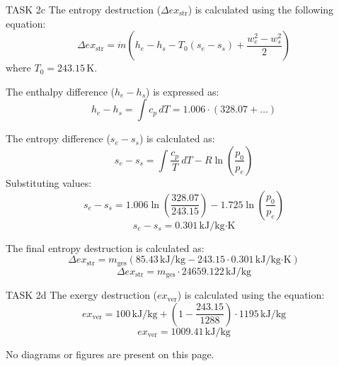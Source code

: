 TASK 2c  
The entropy destruction (\( \Delta ex_{\text{str}} \)) is calculated using the following equation:  
\[
\Delta ex_{\text{str}} = \dot{m}(h_e - h_s - T_0(s_e - s_s) + \frac{w_e^2 - w_s^2}{2})
\]  
where \( T_0 = 243.15 \, \text{K} \).  

The enthalpy difference (\( h_e - h_s \)) is expressed as:  
\[
h_e - h_s = \int c_p \, dT = 1.006 \cdot (328.07 + \dots)  
\]  

The entropy difference (\( s_e - s_s \)) is calculated as:  
\[
s_e - s_s = \int \frac{c_p}{T} \, dT - R \ln \left( \frac{p_0}{p_e} \right)  
\]  
Substituting values:  
\[
s_e - s_s = 1.006 \ln \left( \frac{328.07}{243.15} \right) - 1.725 \ln \left( \frac{p_0}{p_e} \right)  
\]  
\[
s_e - s_s = 0.301 \, \text{kJ/kg·K}  
\]  

The final entropy destruction is calculated as:  
\[
\Delta ex_{\text{str}} = m_{\text{ges}} \left( 85.43 \, \text{kJ/kg} - 243.15 \cdot 0.301 \, \text{kJ/kg·K} \right)  
\]  
\[
\Delta ex_{\text{str}} = m_{\text{ges}} \cdot 24659.122 \, \text{kJ/kg}  
\]  

TASK 2d  
The exergy destruction (\( ex_{\text{ver}} \)) is calculated using the equation:  
\[
ex_{\text{ver}} = 100 \, \text{kJ/kg} + \left( 1 - \frac{243.15}{1288} \right) \cdot 1195 \, \text{kJ/kg}  
\]  
\[
ex_{\text{ver}} = 1009.41 \, \text{kJ/kg}  
\]  

No diagrams or figures are present on this page.